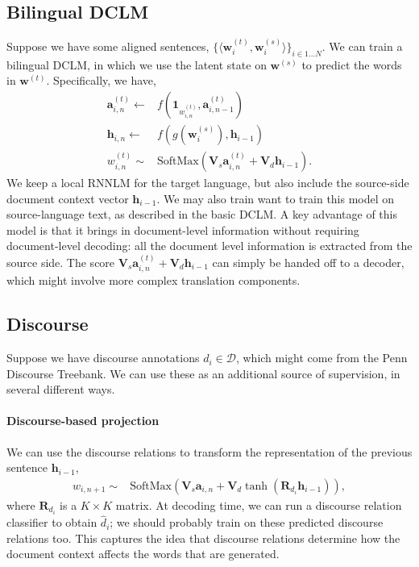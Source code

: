 \documentclass[11pt,a4paper]{article}
\renewcommand{\vec}[1]{\mathbf{#1}}
\newcommand{\vh}[0]{\vec{h}}
\newcommand{\vw}[0]{\vec{w}}
\newcommand{\vwt}[0]{\vw^{(t)}}
\newcommand{\vws}[0]{\vw^{(s)}}
\newcommand{\wt}[0]{w^{(t)}}
\newcommand{\va}[0]{\vec{a}}
\newcommand{\vat}[0]{\vec{a}^{(t)}}
\newcommand{\tuple}[1]{\langle #1 \rangle}
\newcommand{\mat}[1]{\bm{#1}}
\newcommand{\set}[1]{\mathcal{#1}}
\begin{document}
\subsection{Bilingual DCLM}
Suppose we have some aligned sentences, $\{\tuple{\vwt_i, \vws_i}\}_{i\in 1\ldots N}$. We can train a bilingual DCLM, in which we use the latent state on $\vws$ to predict the words in $\vwt$. Specifically, we have,
\begin{align}
\vat_{i,n} \leftarrow & f(\vec{1}_{\wt_{i,n}},\vat_{i,n-1}) \\
\vh_{i,n} \leftarrow & f(g(\vws_i), \vh_{i-1}) \\
\wt_{i,n} \sim & \text{SoftMax}(\mat{V}_s \vat_{i,n}
+ \mat{V}_d \vh_{i-1}).
\end{align}
We keep a local RNNLM for the target language, but also include the source-side document context vector $\vh_{i-1}$. We may also train want to train this model on source-language text, as described in the basic DCLM. A key advantage of this model is that it brings in document-level information without requiring document-level decoding: all the document level information is extracted from the source side. The score $\mat{V}_s \vat_{i,n} + \mat{V}_d \vh_{i-1}$ can simply be handed off to a decoder, which might involve more complex translation components.

\subsection{Discourse}
Suppose we have discourse annotations $d_{i} \in \set{D}$, which might come from the Penn Discourse Treebank. We can use these as an additional source of supervision, in several different ways.

\paragraph{Discourse-based projection}
We can use the discourse relations to transform the representation of the previous sentence $\vh_{i-1}$,
\begin{align}
w_{i,n+1} \sim & \text{SoftMax}(\mat{V}_s \va_{i,n} + \mat{V}_d \tanh(\mat{R}_{d_i} \vh_{i-1})),
\end{align}
where $\mat{R}_{d_i}$ is a $K\times K$ matrix. At decoding time, we can run a discourse relation classifier to obtain $\hat{d}_i$; we should probably train on these predicted discourse relations too. This captures the idea that discourse relations determine how the document context affects the words that are generated.
\end{document}
